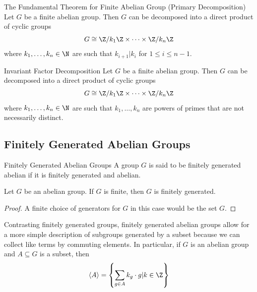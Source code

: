 \documentclass[a4paper]{article}
\begin{document}
\begin{thm}{The Fundamental Theorem for Finite Abelian Group (Primary Decomposition)}{} Let $G$ be a finite abelian group. Then $G$ can be decomposed into a direct product of cyclic groups $$G\cong\Z/k_1\Z\times\dots\times\Z/k_n\Z$$ where $k_1,\dots,k_n\in\N$ are such that $k_{i+1}|k_i$ for $1\leq i\leq n-1$. 
\end{thm}

\begin{thm}{Invariant Factor Decomposition}{} Let $G$ be a finite abelian group. Then $G$ can be decomposed into a direct product of cyclic groups $$G\cong\Z/k_1\Z\times\dots\times\Z/k_n\Z$$ where $k_1,\dots,k_n\in\N$ are such that $k_1,\dots,k_n$ are powers of primes that are not necessarily distinct. 
\end{thm}

\subsection{Finitely Generated Abelian Groups}
\begin{defn}{Finitely Generated Abelian Groups}{} A group $G$ is said to be finitely generated abelian if it is finitely generated and abelian. 
\end{defn}

\begin{lmm}{}{} Let $G$ be an abelian group. If $G$ is finite, then $G$ is finitely generated. 
\begin{proof}
A finite choice of generators for $G$ in this case would be the set $G$. 
\end{proof}
\end{lmm}

Contrasting finitely generated groups, finitely generated abelian groups allow for a more simple description of subgroups generated by a subset because we can collect like terms by commuting elements. In particular, if $G$ is an abelian group and $A\subseteq G$ is a subset, then $$\langle A\rangle=\left\{\sum_{g\in A}k_g\cdot g|k\in\Z\right\}$$
\end{document}
